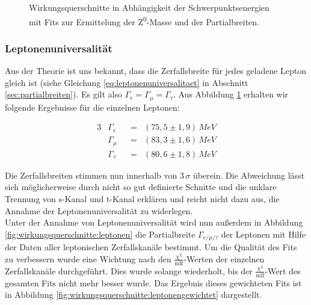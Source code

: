 \begin{figure}
	\caption[Wirkungsquerschnitte in Abhängigkeit der Schwerpunktsenergien]{Wirkungsquerschnitte in Abhängigkeit der Schwerpunktsenergien mit Fits zur Ermittelung der Z\textsuperscript0-Masse und der Partialbreiten.}
	\label{fig:wirkungsquerschnitte}
\end{figure}

\subsubsection{Leptonenuniversalität}

Aus der Theorie ist uns bekannt, dass die Zerfallsbreite für jedes geladene Lepton gleich ist (siehe Gleichung \ref{eq:leptonenuniversalitaet} in Abschnitt \ref{sec:partialbreiten}). Es gilt also $\Gamma_e=\Gamma_\mu=\Gamma_\tau$. Aus Abbildung \ref{fig:wirkungsquerschnitte} erhalten wir folgende Ergebnisse für die einzelnen Leptonen:

\begin{alignat}{3}
	&\Gamma_e&&=&(75,5\pm1,9)\,\si{MeV}\\
	&\Gamma_\mu&&=&(83,3\pm1,6)\,\si{MeV}\\
	&\Gamma_\tau&&=&(80,6\pm1,8)\,\si{MeV}
\end{alignat}

Die Zerfallsbreiten stimmen nun innerhalb von $3\,\sigma$ überein. Die Abweichung lässt sich möglicherweise durch nicht so gut definierte Schnitte und die unklare Trennung von s-Kanal und t-Kanal erklären und reicht nicht dazu aus, die Annahme der Leptonenuniversalität zu widerlegen.\\

Unter der Annahme von Leptonenuniversalität wird nun außerdem in Abbildung \ref{fig:wirkungsquerschnitte:leptonen} die Partialbreite $\Gamma_{e/\mu/\tau}$ der Leptonen mit Hilfe der Daten aller leptonischen Zerfallskanäle bestimmt. Um die Qualität des Fits zu verbessern wurde eine Wichtung nach den $\frac{\chi^2}{\mathrm{ndf}}$-Werten der einzelnen Zerfallskanäle durchgeführt. Dies wurde solange wiederholt, bis der $\frac{\chi^2}{\mathrm{ndf}}$-Wert des gesamten Fits nicht mehr besser wurde. Das Ergebnis dieses gewichteten Fits ist in Abbildung \ref{fig:wirkungsquerschnitte:leptonengewichtet} dargestellt.

